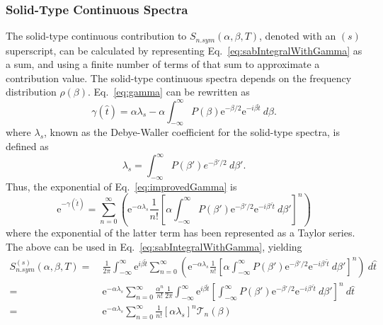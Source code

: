 \documentclass[../master.tex]{subfiles}
\begin{document}
			\subsubsection{Solid-Type Continuous Spectra}
                                The solid-type continuous contribution to $S_{n.sym}(\alpha,\beta,T)$, denoted with an $(s)$ superscript, can be calculated by representing Eq.~\ref{eq:sabIntegralWithGamma} as a sum, and using a finite number of terms of that sum to approximate a contribution value. The solid-type continuous spectra depends on the frequency distribution $\rho(\beta)$.
				Eq.~\ref{eq:gamma} can be rewritten as 
				\begin{equation} 
					\gamma(\hat{t})=\alpha\lambda_s-\alpha\int_{-\infty}^{\infty}P(\beta)\mathrm{e}^{-\beta/2}\mathrm{e}^{-i\beta\hat{t}}~d\beta.\label{eq:improvedGamma}
				\end{equation}
				where $\lambda_s$, known as the Debye-Waller coefficient for the solid-type spectra, is defined as 
				\begin{equation}
					\lambda_s = \int_{-\infty}^\infty P(\beta')e^{-\beta'/2}~d\beta'.
				\end{equation}
				Thus, the exponential of Eq.~\ref{eq:improvedGamma} is
				\begin{equation} 
					\mathrm{e}^{-\gamma(\hat{t})}=\sum_{n=0}^\infty\left(\mathrm{e}^{-\alpha\lambda_s}\frac{1}{n!}\left[\alpha\int_{-\infty}^{\infty}P(\beta')\mathrm{e}^{-\beta'/2}\mathrm{e}^{-i\beta'\hat{t}}~d\beta'\right]^n\right)
				\end{equation}
				where the exponential of the latter term has been represented as a Taylor series. The above can be used in Eq.~\ref{eq:sabIntegralWithGamma}, yielding
				\begin{align}
                                       S^{(s)}_{n.sym}(\alpha,\beta,T)=~&\frac{1}{2\pi}\int_{-\infty}^{\infty}\mathrm{e}^{i\beta\hat{t}}\sum_{n=0}^\infty\left(\mathrm{e}^{-\alpha\lambda_s}\frac{1}{n!}\left[\alpha\int_{-\infty}^{\infty}P(\beta')\mathrm{e}^{-\beta'/2}\mathrm{e}^{-i\beta'\hat{t}}~d\beta'\right]^n\right)~d\hat{t}\\
					=~&\mathrm{e}^{-\alpha\lambda_s}\sum_{n=0}^\infty\frac{\alpha^n}{n!}\frac{1}{2\pi}\int_{-\infty}^{\infty}\mathrm{e}^{i\beta\hat{t}}\left[\int_{-\infty}^{\infty}P(\beta')\mathrm{e}^{-\beta'/2}\mathrm{e}^{-i\beta'\hat{t}}~d\beta'\right]^n~d\hat{t}\\
					=~&\mathrm{e}^{-\alpha\lambda_{s}}\sum_{n=0}^{\infty}\frac{1}{n!}\left[\alpha\lambda_{s}\right]^{n}\mathcal{T}_{n}(\beta)\label{eq:sumToGetToContinSab}
				\end{align}
\end{document}
